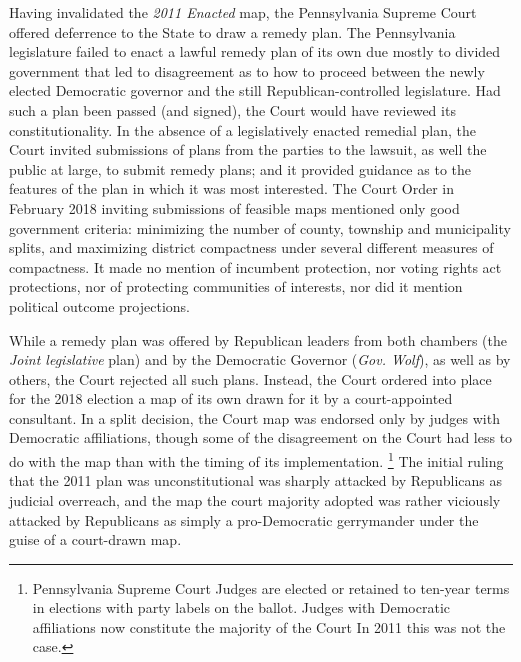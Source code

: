     Having invalidated the \textit{2011 Enacted} map, the Pennsylvania Supreme Court offered deferrence to the State to draw a remedy plan. The Pennsylvania legislature failed to enact a lawful remedy plan of its own due mostly to divided government that led to disagreement as to how to proceed between the newly elected Democratic governor and the still Republican-controlled legislature. Had such a plan been passed (and signed), the Court would have reviewed its constitutionality. In the absence of a legislatively enacted remedial plan, the Court invited submissions of plans from the parties to the lawsuit, as well the public at large, to submit remedy plans; and it provided guidance as to the features of the plan in which it was most interested. The Court Order in February 2018 inviting submissions of feasible maps mentioned only good government criteria: minimizing the number of county, township and municipality splits, and maximizing district compactness under several different measures of compactness. It made no mention of incumbent protection, nor voting rights act protections, nor of protecting communities of interests, nor did it mention political outcome projections.
\par
    While a remedy plan was offered by Republican leaders from both chambers (the \textit{Joint legislative} plan) and by the Democratic Governor (\textit{Gov. Wolf}), as well as by others, the Court rejected all such plans. Instead, the Court ordered into place for the 2018 election a map of its own drawn for it by a court-appointed consultant. In a split decision, the Court map was endorsed only by judges with Democratic affiliations, though some of the disagreement on the Court had less to do with the map than with the timing of its implementation.
        \footnote{Pennsylvania Supreme Court Judges are elected or retained to ten-year terms in elections with party labels on the ballot. Judges with Democratic affiliations now constitute the majority of the Court In 2011 this was not the case.}
    The initial ruling that the 2011 plan was unconstitutional was sharply attacked by Republicans as judicial overreach, and the map the court majority adopted was rather viciously attacked by Republicans as simply a pro-Democratic gerrymander under the guise of a court-drawn map.

